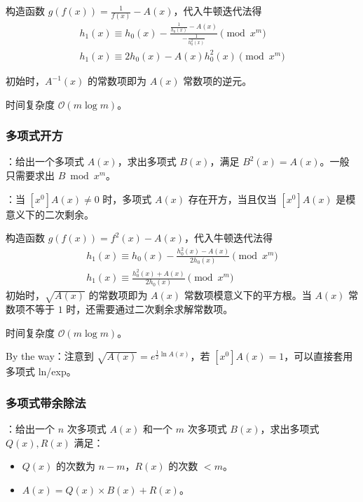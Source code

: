 构造函数 $g(f(x)) = \frac{1}{f(x)} - A(x)$，代入牛顿迭代法得
\[
\begin{gathered}
h_1(x) \equiv h_0(x) - \frac{\frac{1}{h_0(x)} - A(x)}{-\frac{1}{h_0^2(x)}} \pmod{x^m} \\
h_1(x) \equiv 2h_0(x) - A(x)h_0^2(x) \pmod{x^m}
\end{gathered}
\]

初始时，$A^{-1}(x)$ 的常数项即为 $A(x)$ 常数项的逆元。

时间复杂度 $\mathcal{O}(m \log m)$。

\subsubsection{多项式开方}

：给出一个多项式 $A(x)$，求出多项式 $B(x)$，满足 $B^2(x) = A(x)$。一般只需要求出 $B \bmod x^m$。

：当 $[x^0]A(x) \neq 0$ 时，多项式 $A(x)$ 存在开方，当且仅当 $[x^0]A(x)$ 是模意义下的二次剩余。

构造函数 $g(f(x)) = f^2(x) - A(x)$，代入牛顿迭代法得
\[
\begin{gathered}
h_1(x) \equiv h_0(x) - \frac{h_0^2(x) - A(x)}{2h_0(x)} \pmod{x^m} \\
h_1(x) \equiv \frac{h_0^2(x) + A(x)}{2h_0(x)} \pmod{x^m}
\end{gathered}
\]
初始时，$\sqrt{A(x)}$ 的常数项即为 $A(x)$ 常数项模意义下的平方根。当 $A(x)$ 常数项不等于 $1$ 时，还需要通过二次剩余求解常数项。

时间复杂度 $\mathcal{O}(m \log m)$。

\begin{quoteblock}
By the way：注意到 $\sqrt{A(x)} = e^{\frac{1}{2}\ln A(x)}$，若 $[x^0]A(x) = 1$，可以直接套用多项式 ln/exp。
\end{quoteblock}

\subsubsection{多项式带余除法}

：给出一个 $n$ 次多项式 $A(x)$ 和一个 $m$ 次多项式 $B(x)$，求出多项式 $Q(x), R(x)$ 满足：

\begin{itemize}
    \item $Q(x)$ 的次数为 $n - m$，$R(x)$ 的次数 $<m$。
    \item $A(x) = Q(x) \times B(x) + R(x)$。
\end{itemize}

